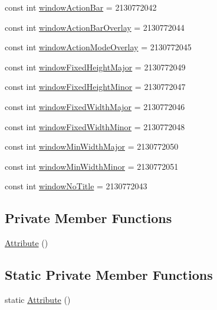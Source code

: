 \begin{CompactItemize}
\item 
const int \hyperlink{class__2doo_1_1_droid_1_1_resource_1_1_attribute_22644611746e6dc0eb8976f4fe8ec4e8}{windowActionBar} = 2130772042
\item 
const int \hyperlink{class__2doo_1_1_droid_1_1_resource_1_1_attribute_43670818784581db0258866a20a49c21}{windowActionBarOverlay} = 2130772044
\item 
const int \hyperlink{class__2doo_1_1_droid_1_1_resource_1_1_attribute_d45bc0457a4310987f22a4ceec7dcd03}{windowActionModeOverlay} = 2130772045
\item 
const int \hyperlink{class__2doo_1_1_droid_1_1_resource_1_1_attribute_8c935d3ebd0228610e9bec7205c90fb4}{windowFixedHeightMajor} = 2130772049
\item 
const int \hyperlink{class__2doo_1_1_droid_1_1_resource_1_1_attribute_2cb92505465ee540e1e85de3f9637ee7}{windowFixedHeightMinor} = 2130772047
\item 
const int \hyperlink{class__2doo_1_1_droid_1_1_resource_1_1_attribute_82cbbef46a65bca3a6feb45ad40d35f5}{windowFixedWidthMajor} = 2130772046
\item 
const int \hyperlink{class__2doo_1_1_droid_1_1_resource_1_1_attribute_34f0fd910ac5f57e3ed8f46759994280}{windowFixedWidthMinor} = 2130772048
\item 
const int \hyperlink{class__2doo_1_1_droid_1_1_resource_1_1_attribute_562a9fc407193ab45d41636464a0c313}{windowMinWidthMajor} = 2130772050
\item 
const int \hyperlink{class__2doo_1_1_droid_1_1_resource_1_1_attribute_459ccd232f91b23deccbc0b8847e8fd8}{windowMinWidthMinor} = 2130772051
\item 
const int \hyperlink{class__2doo_1_1_droid_1_1_resource_1_1_attribute_5c68227dee7a85db47b0fc1face6221c}{windowNoTitle} = 2130772043
\end{CompactItemize}
\subsection*{Private Member Functions}
\begin{CompactItemize}
\item 
\hyperlink{class__2doo_1_1_droid_1_1_resource_1_1_attribute_ea53197985a8f8346d803240d0d7649b}{Attribute} ()
\end{CompactItemize}
\subsection*{Static Private Member Functions}
\begin{CompactItemize}
\item 
static \hyperlink{class__2doo_1_1_droid_1_1_resource_1_1_attribute_cf00e5fc47e5997a92f0a6971adc43d6}{Attribute} ()
\end{CompactItemize}


